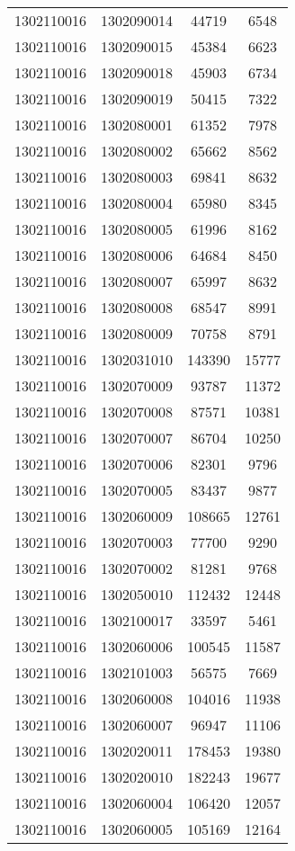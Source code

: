 \begin{longtable}{llcc}
1302110016 & 1302090014 & 44719 & 6548\\
1302110016 & 1302090015 & 45384 & 6623\\
1302110016 & 1302090018 & 45903 & 6734\\
1302110016 & 1302090019 & 50415 & 7322\\
1302110016 & 1302080001 & 61352 & 7978\\
1302110016 & 1302080002 & 65662 & 8562\\
1302110016 & 1302080003 & 69841 & 8632\\
1302110016 & 1302080004 & 65980 & 8345\\
1302110016 & 1302080005 & 61996 & 8162\\
1302110016 & 1302080006 & 64684 & 8450\\
1302110016 & 1302080007 & 65997 & 8632\\
1302110016 & 1302080008 & 68547 & 8991\\
1302110016 & 1302080009 & 70758 & 8791\\
1302110016 & 1302031010 & 143390 & 15777\\
1302110016 & 1302070009 & 93787 & 11372\\
1302110016 & 1302070008 & 87571 & 10381\\
1302110016 & 1302070007 & 86704 & 10250\\
1302110016 & 1302070006 & 82301 & 9796\\
1302110016 & 1302070005 & 83437 & 9877\\
1302110016 & 1302060009 & 108665 & 12761\\
1302110016 & 1302070003 & 77700 & 9290\\
1302110016 & 1302070002 & 81281 & 9768\\
1302110016 & 1302050010 & 112432 & 12448\\
1302110016 & 1302100017 & 33597 & 5461\\
1302110016 & 1302060006 & 100545 & 11587\\
1302110016 & 1302101003 & 56575 & 7669\\
1302110016 & 1302060008 & 104016 & 11938\\
1302110016 & 1302060007 & 96947 & 11106\\
1302110016 & 1302020011 & 178453 & 19380\\
1302110016 & 1302020010 & 182243 & 19677\\
1302110016 & 1302060004 & 106420 & 12057\\
1302110016 & 1302060005 & 105169 & 12164\\

\end{longtable}
